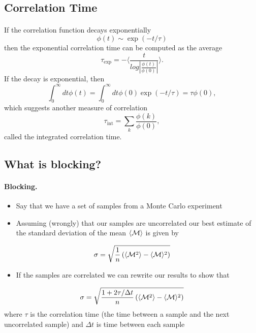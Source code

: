 \documentclass[%
twoside,                 %
final,                   %
10pt]{article}
\begin{document}
\subsection{Correlation Time}

\paragraph{}

If the correlation function decays exponentially
\[ \phi (t) \sim \exp{(-t/\tau)}\]
then the exponential correlation time can be computed as the average
\[   \tau_{\mathrm{exp}}  =  -\langle  \frac{t}{log|\frac{\phi(t)}{\phi(0)}|} \rangle. \]
If the decay is exponential, then
\[  \int_0^{\infty} dt \phi(t)  = \int_0^{\infty} dt \phi(0)\exp{(-t/\tau)}  = \tau \phi(0),\] 
which  suggests another measure of correlation
\[   \tau_{\mathrm{int}} = \sum_k \frac{\phi(k)}{\phi(0)}, \]
called the integrated correlation time.




\subsection{What is blocking?}

\paragraph{Blocking.}
\begin{itemize}
    \item Say that we have a set of samples from a Monte Carlo experiment

    \item Assuming (wrongly) that our samples are uncorrelated our best estimate of the standard deviation of the mean $\langle {\cal M}\rangle$ is given by
\end{itemize}

\noindent
\[
\sigma=\sqrt{\frac{1}{n}\left(\langle {\cal M}^2\rangle-\langle {\cal M}\rangle^2\right)} 
\]
\begin{itemize}
    \item If the samples are correlated we can rewrite our results to show  that
\end{itemize}

\noindent
\[
\sigma=\sqrt{\frac{1+2\tau/\Delta t}{n}\left(\langle {\cal M}^2\rangle-\langle {\cal M}\rangle^2\right)}
\]
      where $\tau$ is the correlation time (the time between a sample and the next uncorrelated sample) and $\Delta t$ is time between each sample
\end{document}
